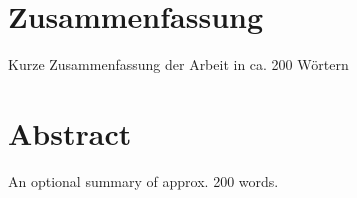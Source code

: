 \chapter*{Zusammenfassung}

Kurze Zusammenfassung der Arbeit in ca. 200 Wörtern

\clearpage

\chapter*{Abstract}

An optional summary of approx. 200 words.


\clearpage
